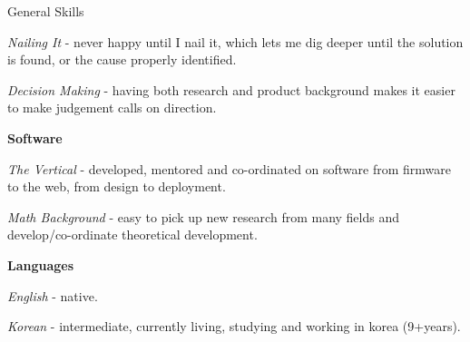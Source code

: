 \documentclass[a4paper,10pt]{article}
\begin{document}
\begin{cvsection}{General Skills}
\begin{djs_itemize}
    \begin{djs_itemize}
      \item \textit{Nailing It} - never happy until I nail it, which lets me dig deeper until the solution is found, or the cause properly identified.
      \item \textit{Decision Making} - having both research and product background makes it easier to make judgement calls on direction.
    \end{djs_itemize}
    \item \textbf{Software}
    \begin{djs_itemize}
      \item \textit{The Vertical} - developed, mentored and co-ordinated on software from firmware to the web, from design to deployment.
      \item \textit{Math Background} - easy to pick up new research from many fields and develop/co-ordinate theoretical development.
    \end{djs_itemize}
    \item \textbf{Languages}
    \begin{djs_itemize}
      \item \textit{English} - native.
      \item \textit{Korean} - intermediate, currently living, studying and working in korea (9+years).
    \end{djs_itemize}
  \end{djs_itemize}
\end{cvsection}

\vspace{2em}
\end{document}
